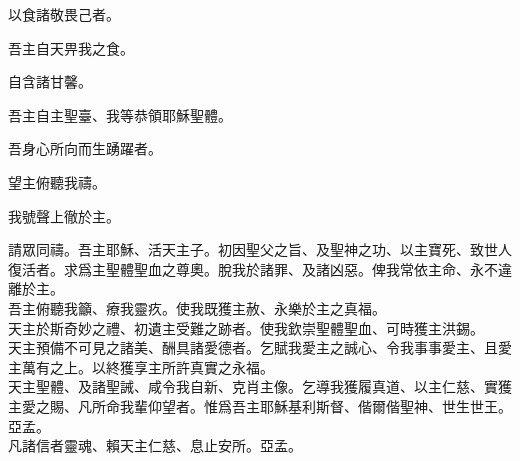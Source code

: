 \Response 以食諸敬畏己者。

\versicle 吾主自天畀我之食。

\Response 自含諸甘馨。

\versicle 吾主自主聖臺、我等恭領耶穌聖體。

\Response 吾身心所向而生踴躍者。

\versicle 望主俯聽我禱。

\Response 我號聲上徹於主。

\versicle 請眾同禱。{\cspace}吾主耶穌、活天主子。初因聖父之旨、及聖神之功、以主寶死、致世人復活者。求爲主聖體聖血之尊奧。脫我於諸罪、及諸凶惡。俾我常依主命、永不違離於主。\\
吾主俯聽我籲、療我靈疚。使我既獲主赦、永樂於主之真福。\\
天主於斯奇妙之禮、初遺主受難之跡者。使我欽崇聖體聖血、可時獲主洪錫。\\
天主預備不可見之諸美、酬具諸愛德者。乞賦我愛主之誠心、令我事事愛主、且愛主萬有之上。以終獲享主所許真實之永福。\\
天主聖體、及諸聖誡、咸令我自新、克肖主像。乞導我獲履真道、以主仁慈、實獲主愛之賜、凡所命我輩仰望者。惟爲吾主耶穌基利斯督、偕爾偕聖神、世生世王。{\cspace}亞孟。\\
凡諸信者靈魂、賴天主仁慈、息止安所。{\cspace}亞孟。
